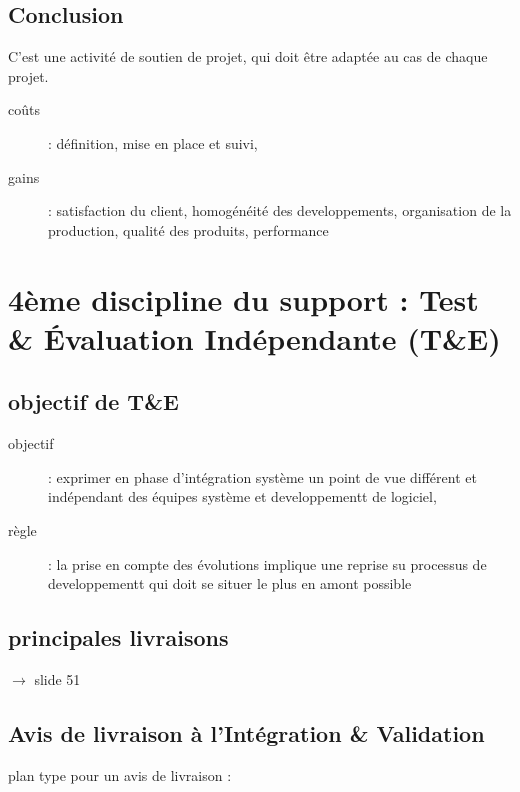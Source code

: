 	\subsection{Conclusion}

C’est une activité de soutien de projet, qui doit être adaptée au cas de chaque projet.

\begin{description}
	\item[coûts] : définition, mise en place et suivi,
	\item[gains] : satisfaction du client, homogénéité des developpements, organisation de la production, qualité des produits, performance
\end{description}

\section{4ème discipline du support : Test \& Évaluation Indépendante (T\&E)}

	\subsection{objectif de T\&E}
	\begin{description}	
		\item[objectif] : exprimer en phase d’intégration système un point de vue différent et indépendant des équipes système et developpementt de logiciel,
		\item[règle] : la prise en compte des évolutions implique une reprise su processus de developpementt qui doit se situer le plus en amont possible
	\end{description}

	\subsection{principales livraisons}
	$\rightarrow$ slide 51 %

	\subsection{Avis de livraison à l’Intégration \& Validation}

	plan type pour un avis de livraison :

